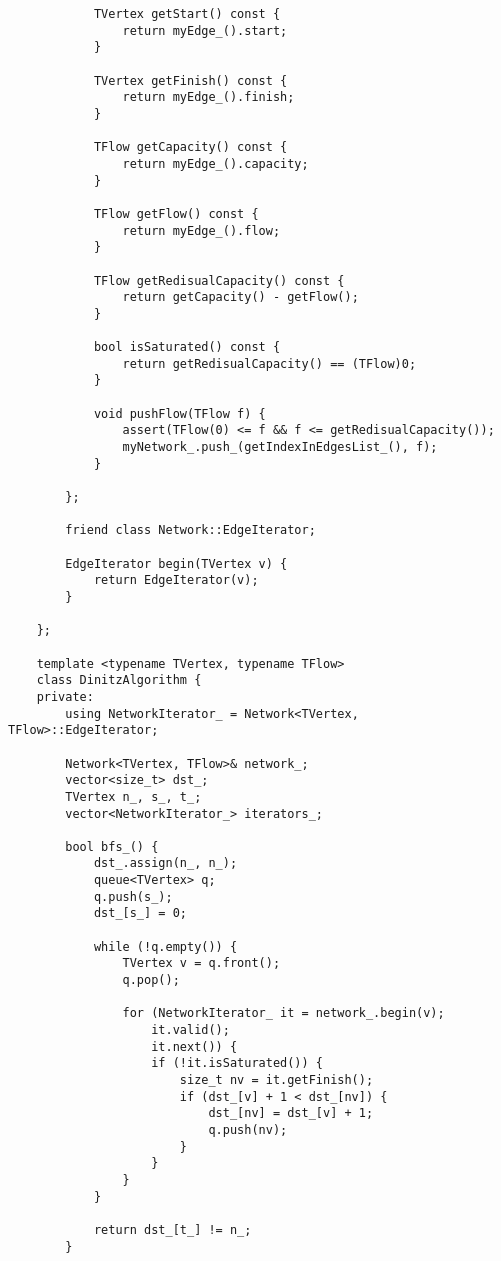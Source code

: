 \begin{lstlisting}
            TVertex getStart() const {
                return myEdge_().start;
            }

            TVertex getFinish() const {
                return myEdge_().finish;
            }

            TFlow getCapacity() const {
                return myEdge_().capacity;
            }

            TFlow getFlow() const {
                return myEdge_().flow;
            }

            TFlow getRedisualCapacity() const {
                return getCapacity() - getFlow();
            }

            bool isSaturated() const {
                return getRedisualCapacity() == (TFlow)0;
            }

            void pushFlow(TFlow f) {
                assert(TFlow(0) <= f && f <= getRedisualCapacity());
                myNetwork_.push_(getIndexInEdgesList_(), f);
            }

        };

        friend class Network::EdgeIterator;

        EdgeIterator begin(TVertex v) {
            return EdgeIterator(v);
        }

    };

    template <typename TVertex, typename TFlow>
    class DinitzAlgorithm {
    private:
        using NetworkIterator_ = Network<TVertex, TFlow>::EdgeIterator;

        Network<TVertex, TFlow>& network_;
        vector<size_t> dst_;
        TVertex n_, s_, t_;
        vector<NetworkIterator_> iterators_;

        bool bfs_() {
            dst_.assign(n_, n_);
            queue<TVertex> q;
            q.push(s_);
            dst_[s_] = 0;

            while (!q.empty()) {
                TVertex v = q.front();
                q.pop();

                for (NetworkIterator_ it = network_.begin(v);
                    it.valid();
                    it.next()) {
                    if (!it.isSaturated()) {
                        size_t nv = it.getFinish();
                        if (dst_[v] + 1 < dst_[nv]) {
                            dst_[nv] = dst_[v] + 1;
                            q.push(nv);
                        }
                    }
                }
            }

            return dst_[t_] != n_;
        }


\end{lstlisting}
